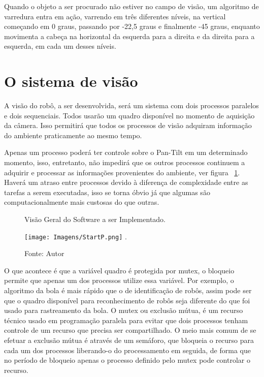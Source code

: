 Quando o objeto a ser procurado não estiver no campo de visão, um algoritmo de varredura entra em ação, varrendo em três diferentes níveis, na vertical começando em 0 graus, passando por -22,5 graus e finalmente -45 graus, enquanto movimenta a cabeça na horizontal da esquerda para a direita e da direita para a esquerda, em cada um desses níveis.


\section{O sistema de visão}
\label{Sistema}

A visão do robô, a ser desenvolvida, será um sistema com dois processos paralelos e dois sequenciais. Todos usarão um quadro disponível no momento de aquisição da câmera. Isso permitirá que todos os processos de visão adquiram informação do ambiente praticamente ao mesmo tempo.

Apenas um processo poderá ter controle sobre o Pan-Tilt em um determinado momento, isso, entretanto, não impedirá que os outros processos continuem a adquirir e processar as informações provenientes do ambiente, ver figura ~\ref{Fig:Start}. Haverá um atraso entre processos devido à diferença de complexidade entre as tarefas a serem executadas, isso se torna óbvio já que algumas são computacionalmente mais custosas do que outras. 


\begin{figure}[!t]
\centering \caption{Visão Geral do Software a ser Implementado.}
\texttt{[image: Imagens/StartP.png]}
\DeclareGraphicsExtensions.
\caption*{Fonte: Autor}
\label{Fig:Start}
\end{figure}


O que acontece é que a variável quadro é protegida por mutex, o bloqueio permite que apenas um dos processos utilize essa variável. Por exemplo, o algoritmo da bola é mais rápido que o de identificação de robôs, assim pode ser que o quadro disponível para reconhecimento de robôs seja diferente do que foi usado para rastreamento da bola. O mutex ou exclusão mútua, é um recurso técnico usado em programação paralela para evitar que dois processos tenham controle de um recurso que precisa ser compartilhado. O meio mais comum de se efetuar a exclusão mútua é através de um semáforo, que bloqueia o recurso para cada um dos processos liberando-o do processamento em seguida, de forma que no período de bloqueio apenas o processo definido pelo mutex pode controlar o recurso.


